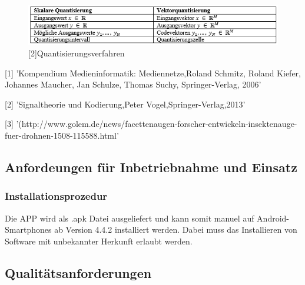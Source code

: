 \begin{figure}[h]
	\centering
		\includegraphics[width=1.0\textwidth]{img/Stephan.png}
	\caption[Quantisierungsverfahren]{[2]Quantisierungsverfahren}
	\label{fig:stephan_quant}
\end{figure}

[1] 'Kompendium Medieninformatik: Mediennetze,Roland Schmitz, Roland Kiefer, Johannes Maucher, Jan Schulze, Thomas Suchy, Springer-Verlag, 2006'

[2] 'Signaltheorie und Kodierung,Peter Vogel,Springer-Verlag,2013'

[3] '(http://www.golem.de/news/facettenaugen-forscher-entwickeln-insektenauge-fuer-drohnen-1508-115588.html'

\subsection{\textbf{Anfordeungen für Inbetriebnahme und Einsatz}}




\subsubsection{Installationsprozedur}

Die \acs{APP} wird als .apk Datei ausgeliefert und kann somit manuel auf Android-Smartphones ab Version 4.4.2 installiert werden.
Dabei muss das Installieren von Software mit unbekannter Herkunft erlaubt werden.




\subsection{\textbf{Qualitätsanforderungen}}

